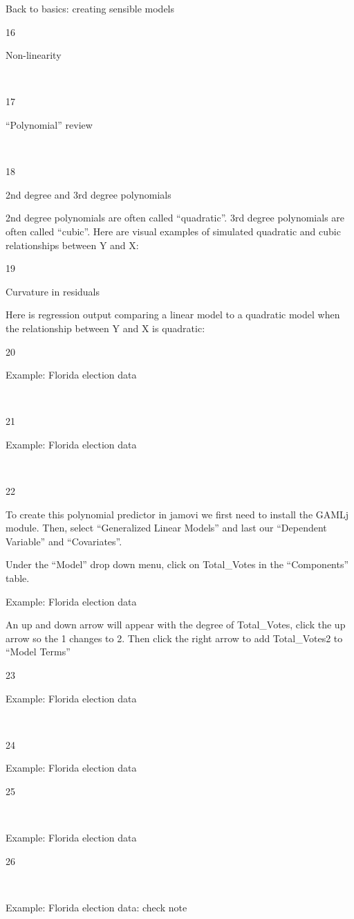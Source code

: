 \documentclass[
  letterpaper,
  DIV=11,
  numbers=noendperiod]{scrreprt}
\begin{document}
Back to basics: creating sensible models

16

Non-linearity

~

17

``Polynomial'' review

~

18

2nd degree and 3rd degree polynomials

2nd degree polynomials are often called ``quadratic''. 3rd degree
polynomials are often called ``cubic''. Here are visual examples of
simulated quadratic and cubic relationships between Y and X:

19

Curvature in residuals

Here is regression output comparing a linear model to a quadratic model
when the relationship between Y and X is quadratic:

20

Example: Florida election data

~

21

Example: Florida election data

~

22

To create this polynomial predictor in jamovi we first need to install
the GAMLj module. Then, select ``Generalized Linear Models'' and last
our ``Dependent Variable'' and ``Covariates''.

Under the ``Model'' drop down menu, click on Total\_Votes in the
``Components'' table.

Example: Florida election data

An up and down arrow will appear with the degree of Total\_Votes, click
the up arrow so the 1 changes to 2. Then click the right arrow to add
Total\_Votes2 to ``Model Terms''

23

Example: Florida election data

~

24

Example: Florida election data

25

~

Example: Florida election data

26

~

Example: Florida election data: check note
\end{document}
